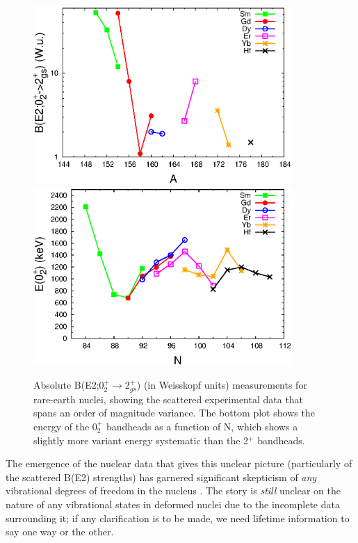 \begin{figure}[h!]
\begin{center}
\includegraphics[width=0.88\textwidth]{figures/Rare_Earth_02_BE2.eps}\\
\includegraphics[width=0.88\textwidth]{figures/Rare_Earth_0s_N.eps}\\
\end{center}
\caption{Absolute B(E2;0$^+_2\rightarrow$2$^+_{gs}$) (in Weisskopf units) measurements for rare-earth nuclei, showing the scattered experimental data that spans an order of magnitude variance. The bottom plot shows the energy of the 0$^+_2$ bandheads as a function of N, which shows a slightly more variant energy systematic than the 2$^+$ bandheads. \label{fig:Rare_Earth_02_BE2}}
\end{figure}

The emergence of the nuclear data that gives this unclear picture (particularly of the scattered B(E2) strengths) has garnered significant skepticism of \textit{any} vibrational degrees of freedom in the nucleus \cite{Garrett_betavib2001}. The story is \textit{still} unclear on the nature of any vibrational states in deformed nuclei due to the incomplete data surrounding it; if any clarification is to be made, we need lifetime information to say one way or the other.


